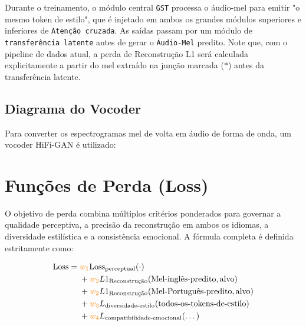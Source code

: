 \documentclass[11pt]{article}
\newcommand{\pathtt}[1]{\texttt{#1}}
\begin{document}
Durante o treinamento, o módulo central \pathtt{GST} processa o áudio-mel para emitir "o mesmo token de estilo", que é injetado em ambos os grandes módulos superiores e inferiores de \pathtt{Atenção cruzada}. As saídas passam por um módulo de \pathtt{transferência latente} antes de gerar o \pathtt{Áudio-Mel} predito. Note que, com o pipeline de dados atual, a perda de Reconstrução L1 será calculada explicitamente a partir do mel extraído na junção marcada ($*$) antes da transferência latente.

\subsection{Diagrama do Vocoder}
Para converter os espectrogramas mel de volta em áudio de forma de onda, um vocoder HiFi-GAN é utilizado:

\vspace{0.5cm}
\begin{center}
\end{center}

\section{Funções de Perda (Loss)}

O objetivo de perda combina múltiplos critérios ponderados para governar a qualidade perceptiva, a precisão da reconstrução em ambos os idiomas, a diversidade estilística e a consistência emocional. A fórmula completa é definida estritamente como:

\[
\begin{aligned}
\text{Loss} = \;& \color{orange}w_1 \color{black}\text{Loss}_{\text{perceptual}}(\cdot) \\
& + \color{orange}w_2 \color{black} L1_{\text{Reconstrução}}(\text{Mel-inglês-predito}, \text{alvo}) \\
& + \color{orange}w_2 \color{black} L1_{\text{Reconstrução}}(\text{Mel-Português-predito}, \text{alvo}) \\
& + \color{orange}w_3 \color{black} L_{\text{diversidade-estilo}}(\text{todos-os-tokens-de-estilo}) \\
& + \color{orange}w_4 \color{black} L_{\text{compatibilidade-emocional}}(\dots)
\end{aligned}
\]
\end{document}
